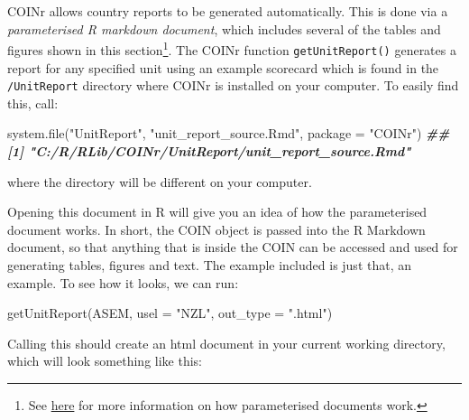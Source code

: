 \documentclass[
]{book}
\newenvironment{Shaded}{\begin{snugshade}}{\end{snugshade}}
\newcommand{\AttributeTok}[1]{\textcolor[rgb]{0.77,0.63,0.00}{#1}}
\newcommand{\DocumentationTok}[1]{\textcolor[rgb]{0.56,0.35,0.01}{\textbf{\textit{#1}}}}
\newcommand{\FunctionTok}[1]{\textcolor[rgb]{0.00,0.00,0.00}{#1}}
\newcommand{\NormalTok}[1]{#1}
\newcommand{\StringTok}[1]{\textcolor[rgb]{0.31,0.60,0.02}{#1}}
\begin{document}
COINr allows country reports to be generated automatically. This is done via a \emph{parameterised R markdown document}, which includes several of the tables and figures shown in this section\footnote{See \href{https://bookdown.org/yihui/rmarkdown/parameterized-reports.html}{here} for more information on how parameterised documents work.}. The COINr function \texttt{getUnitReport()} generates a report for any specified unit using an example scorecard which is found in the \texttt{/UnitReport} directory where COINr is installed on your computer. To easily find this, call:

\begin{Shaded}
\begin{Highlighting}[]
\FunctionTok{system.file}\NormalTok{(}\StringTok{"UnitReport"}\NormalTok{, }\StringTok{"unit\_report\_source.Rmd"}\NormalTok{, }\AttributeTok{package =} \StringTok{"COINr"}\NormalTok{)}
\DocumentationTok{\#\# [1] "C:/R/RLib/COINr/UnitReport/unit\_report\_source.Rmd"}
\end{Highlighting}
\end{Shaded}

where the directory will be different on your computer.

Opening this document in R will give you an idea of how the parameterised document works. In short, the COIN object is passed into the R Markdown document, so that anything that is inside the COIN can be accessed and used for generating tables, figures and text. The example included is just that, an example. To see how it looks, we can run:

\begin{Shaded}
\begin{Highlighting}[]
\FunctionTok{getUnitReport}\NormalTok{(ASEM, }\AttributeTok{usel =} \StringTok{"NZL"}\NormalTok{, }\AttributeTok{out\_type =} \StringTok{".html"}\NormalTok{)}
\end{Highlighting}
\end{Shaded}

Calling this should create an html document in your current working directory, which will look something like this:
\end{document}
